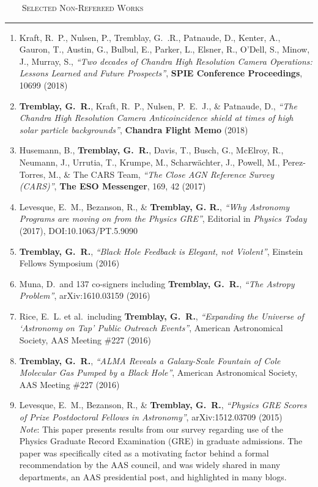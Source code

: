 \documentclass[11pt]{article}
\makeatletter
\def\vhrulefill#1{\leavevmode\leaders\hrule\@height#1\hfill \kern\z@}
\makeatother
\begin{document}
\noindent \textsc{ ~~~~Selected Non-Refereed Works} \vhrulefill{0.4pt}

\begin{enumerate}

\item Kraft, R.~P., Nulsen, P., Tremblay, G.~.R., Patnaude, D., Kenter, A.,
Gauron, T., Austin, G., Bulbul, E., Parker, L., Elsner, R., O'Dell, S.,
Minow, J., Murray, S., \textit{``Two decades of Chandra High Resolution Camera
Operations: Lessons Learned and Future Prospects''}, \textbf{SPIE Conference Proceedings},
10699 (2018)

\item \textbf{Tremblay, G.~R.}, Kraft, R.~P., Nulsen, P.~E.~J.,
\& Patnaude, D., \textit{``The Chandra High Resolution Camera Anticoincidence shield at times of high solar particle backgrounds''}, \textbf{Chandra Flight Memo} (2018)


\item Husemann, B., \textbf{Tremblay, G.~R.}, Davis, T., Busch, G., McElroy, R., Neumann, J., Urrutia, T.,
Krumpe, M., Scharw\"{a}chter, J., Powell, M., Perez-Torres, M., \& The CARS Team, \textit{``The Close AGN Reference Survey (CARS)''}, \textbf{The ESO Messenger}, 169, 42 (2017)

\item Levesque, E.~M., Bezanson, R., \& \textbf{Tremblay, G. R.},
\textit{``Why Astronomy Programs are moving on from the Physics GRE''}, Editorial in \textit{Physics Today} (2017), DOI:10.1063/PT.5.9090

\item \textbf{Tremblay, G.~R.}, \textit{``Black Hole Feedback is Elegant, not Violent''}, Einstein Fellows Symposium (2016)

\item Muna, D.~and 137 co-signers including \textbf{Tremblay, G.~R.},
\textit{``The Astropy Problem''}, arXiv:1610.03159 (2016)


\item Rice, E.~L. et al.~including \textbf{Tremblay, G.~R.}, \textit{``Expanding the Universe of `Astronomy on Tap' Public Outreach Events''}, American Astronomical Society, AAS Meeting \#227 (2016)


\item \textbf{Tremblay, G.~R.}, \textit{``ALMA Reveals a Galaxy-Scale Fountain of Cole Molecular Gas Pumped by a Black Hole''}, American Astronomical Society, AAS Meeting \#227 (2016)

\item Levesque, E.~M., Bezanson, R., \&  \textbf{Tremblay, G.~R.}, \textit{``Physics GRE Scores of Prize Postdoctoral Fellows in Astronomy''}, arXiv:1512.03709 (2015) \\
\textit{Note}: This paper presents results from our survey regarding
use of the Physics Graduate Record Examination (GRE) in graduate admissions. The paper was specifically cited as a motivating factor behind a formal recommendation by the AAS council, and was widely shared in many departments, an AAS presidential post, and highlighted in many blogs.



\end{enumerate}
\end{document}
